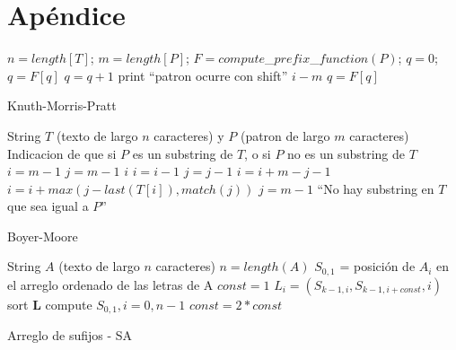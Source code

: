 \chapter*{Apéndice}

\begin{algorithm}
\begin{algorithmic}[1]
\STATE $n = length[T]$;
\STATE $m = length[P]$;
\STATE $F = compute$\_$prefix$\_$function(P)$;
\STATE $q = 0$; 
    	\STATE $q = F[q]$
	\ENDWHILE
		\STATE $q = q + 1$
	\ENDIF
		\STATE print ``patron ocurre con shift''  $i - m$
		\STATE $q = F[q]$
	\ENDIF
\ENDFOR
\end{algorithmic}
\caption{Knuth-Morris-Pratt} \label{alg:algoritmo1}
\end{algorithm}

\newpage

\begin{algorithm}
\begin{algorithmic}[1]
\REQUIRE String $T$ (texto de largo $n$ caracteres) y $P$ (patron de largo $m$ caracteres)
\ENSURE Indicacion de que si $P$ es un substring de $T$, o si $P$ no es un substring de $T$
\STATE $i = m-1$
\STATE $j = m-1$
\REPEAT
			\RETURN $i$
		\ELSE
			\STATE $i = i-1$
			\STATE $j = j-1$
		\ENDIF
	\ELSE
		\STATE $i = i + m - j - 1$
		\STATE $i = i + max(j-last(T[i]), match(j))$
		\STATE $j = m-1$
	\ENDIF
{}
\RETURN ``No hay substring en $T$ que sea igual a $P$''
\end{algorithmic}
\caption{Boyer-Moore} \label{alg:algoritmo2}
\end{algorithm}

\newpage

\begin{algorithm}
\begin{algorithmic}[1]
\REQUIRE String $A$ (texto de largo $n$ caracteres)
\STATE $n = length(A)$
	\STATE $S_{0,1}$ = posición de $A_{i}$ en el arreglo ordenado de las letras de A
\ENDFOR
\STATE $const = 1$
			\STATE $L_{i} = (S_{k-1,i}, S_{k-1,i+const}, i)$
		\ENDFOR
		\STATE sort \textbf{L}
		\STATE compute $S_{0,1}, i=0,n-1$
		\STATE $const = 2*const$
	\ENDFOR
\ENDIF
\end{algorithmic}
\caption{Arreglo de sufijos - SA} \label{alg:algoritmo3}
\end{algorithm}

